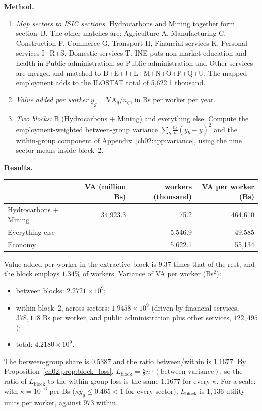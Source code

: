 \documentclass[../solutions_manual.tex]{subfiles}
\begin{document}
\textbf{Method.}
\begin{enumerate}
\item \emph{Map sectors to ISIC sections.} Hydrocarbons and Mining together form section~B. The other matches are: Agriculture A, Manufacturing C, Construction F, Commerce G, Transport H, Financial services K, Personal services I+R+S, Domestic services T. INE puts non-market education and health in Public administration, so Public administration and Other services are merged and matched to D+E+J+L+M+N+O+P+Q+U. The mapped employment adds to the ILOSTAT total of 5{,}622.1 thousand.
\item \emph{Value added per worker} $y_g = \text{VA}_g/n_g$, in Bs per worker per year.
\item \emph{Two blocks:} B (Hydrocarbons + Mining) and everything else. Compute the employment-weighted between-group variance $\sum_b \frac{n_b}{n}(\bar y_b - \bar y)^2$ and the within-group component of Appendix~\ref{ch02:app:variance}, using the nine sector means inside block~2.
\end{enumerate}

\textbf{Results.}
\begin{center}
\small
\begin{tabular}{lrrr}
\toprule
& VA (million Bs) & workers (thousand) & VA per worker (Bs)\\
\midrule
Hydrocarbons + Mining & 34{,}923.3 & 75.2 & 464{,}610 \\
Everything else & & 5{,}546.9 & 49{,}585 \\
Economy & & 5{,}622.1 & 55{,}134 \\
\bottomrule
\end{tabular}
\end{center}
Value added per worker in the extractive block is $9.37$ times that of the rest, and the block employs $1.34\%$ of workers. Variance of VA per worker (Bs$^2$):
\begin{itemize}
\item between blocks: $2.2721\times10^{9}$;
\item within block~2, across sectors: $1.9458\times10^{9}$ (driven by financial services, $378{,}118$ Bs per worker, and public administration plus other services, $122{,}495$);
\item total: $4.2180\times10^{9}$.
\end{itemize}
The between-group share is $0.5387$ and the ratio between/within is $1.1677$. By Proposition~\ref{ch02:prop:block_loss}, $L_{\text{block}} = \frac{\kappa}{2}n\cdot(\text{between variance})$, so the ratio of $L_{\text{block}}$ to the within-group loss is the same $1.1677$ for every $\kappa$. For a scale: with $\kappa = 10^{-6}$ per Bs ($\kappa y_g \le 0.465 < 1$ for every sector), $L_{\text{block}}$ is $1{,}136$ utility units per worker, against $973$ within.
\end{document}
